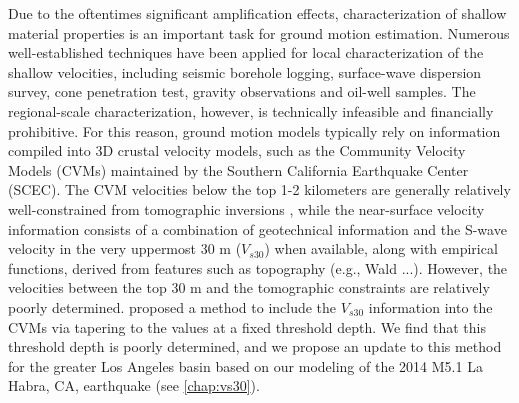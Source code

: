 Due to the oftentimes significant amplification effects, characterization of shallow material properties is an important task for ground motion estimation. Numerous well-established techniques have been applied for local characterization of the shallow velocities, including seismic borehole logging, surface-wave dispersion survey, cone penetration test, gravity observations and oil-well samples. The regional-scale characterization, however, is technically infeasible and financially prohibitive. For this reason, ground motion models typically rely on information compiled into 3D crustal velocity models, such as the Community Velocity Models (CVMs) maintained by the Southern California Earthquake Center (SCEC). The CVM velocities below the top 1-2 kilometers are generally relatively well-constrained from tomographic inversions , while the near-surface velocity information consists of a combination of geotechnical information and the S-wave velocity in the very uppermost 30 m ($V_{s30}$) when available, along with empirical functions, derived from features such as topography (e.g., Wald ...). However, the velocities between the top 30 m and the tomographic constraints are relatively poorly determined. \citet{elyVs30derivedNearsurfaceSeismic2010} proposed a method to include the $V_{s30}$ information into the CVMs via tapering to the values at a fixed threshold depth. We find that this threshold depth is poorly determined, and we propose an update to this method for the greater Los Angeles basin based on our modeling of the 2014 M5.1 La Habra, CA, earthquake (see \cref{chap:vs30}). 




